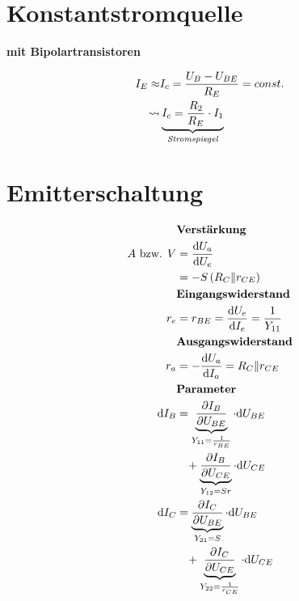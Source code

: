 \section*{Konstantstromquelle}
\textbf{mit Bipolartransistoren}

\begin{multicols}{2}
	
	\begin{center}
		
	\end{center}
	
	\begin{align*}
		I_E \approx &I_c = \frac{U_B - U_{BE}}{R_E} = const.
		\\
		   \leadsto  &\underbrace{I_c = \frac{R_2}{R_E} \cdot I_1}_\emph{Stromspiegel} 
	\end{align*}

\end{multicols}


\section*{Emitterschaltung}

\begin{multicols}{2}

	\begin{center}
		
	\end{center}


	\begin{align*}
		&\textbf{Verstärkung}
		\\
		A \text{ bzw. } V &= \frac{\mathrm{d}U_a}{\mathrm{d}U_e}
		\\
						  &= -S\left( R_C \| r_{CE} \right)
		\\
		&\textbf{Eingangswiderstand}
		\\
		r_e &= r_{BE} = \frac{\mathrm{d}U_e}{\mathrm{d}I_e} = \frac{1}{Y_{11}}
		\\
		&\textbf{Ausgangswiderstand}
		\\
		r_a &= - \frac{\mathrm{d}U_a}{\mathrm{d}I_a} = R_C \| r_{CE}
		\\
		&\textbf{Parameter}
		\\
		\mathrm{d}I_B &= \underbrace{\frac{\partial I_B}{\partial U_{BE}}}_{Y_{11} = \frac{1}{r_{BE}}}
		\cdot \mathrm{d}U_{BE} 
		\\
		&\hspace{3mm}+ \underbrace{\frac{\partial I_B}{\partial U_{CE}}}_{Y_{12} =
		Sr} \cdot \mathrm{d}U_{CE}
		\\
		\mathrm{d}I_C &= \underbrace{\frac{\partial I_C}{\partial U_{BE}}}_{Y_{21} = S}
		\cdot \mathrm{d}U_{BE} 
		\\
		&\hspace{3mm}+ \underbrace{\frac{\partial I_C}{\partial U_{CE}}}_{Y_{22} =
		\frac{1}{r_{CE}}} \cdot \mathrm{d}U_{CE}
	\end{align*}
	
\end{multicols}

